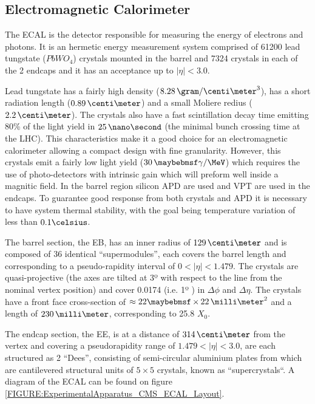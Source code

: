 \subsection{Electromagnetic Calorimeter}
\label{SUBSECTION:ExperimentalApparatus_CMS_ECAL}


The \gls{ECAL} is the detector responsible for measuring the energy of electrons and photons. It is an hermetic energy measurement system comprised of 61200 lead tungstate ($PbWO_4$) crystals mounted in the barrel and 7324 crystals in each of the 2 endcaps and it has an acceptance up to $|\eta|<3.0$.

Lead tungstate has a fairly high density ($8.28\,\gram/\centi\meter^3$), has a short radiation length ($0.89\,\centi\meter$) and a small Moliere redius ($2.2\,\centi\meter$). The crystals also have a fast scintillation decay time emitting 80\% of the light yield in $25\,\nano\second$ (the minimal bunch crossing time at the \gls{LHC}). This characteristics make it a good choice for an electromagnetic calorimeter allowing a compact design with fine granularity. However, this crystals emit a fairly low light yield ($30\,\gamma/\MeV$) which requires the use of photo-detectors with intrinsic gain which will preform well inside a magnitic field. In the barrel region silicon \gls{APD} are used and \gls{VPT} are used in the endcaps. To guarantee good response from both crystals and \gls{APD} it is necessary to have system thermal stability, with the goal being temperature variation of less than $0.1 \celsius$.

The barrel section, the \gls{EB}, has an inner radius of $129\,\centi\meter$ and is composed of 36 identical ``supermodules'', each covers the barrel length and corresponding to a pseudo-rapidity interval of $0<|\eta|<1.479$. The crystals are quasi-projective (the axes are tilted at 3º with respect to the line from the nominal vertex position) and cover 0.0174 (i.e. 1º ) in $\Delta\phi$ and $\Delta\eta$. The crystals have a front face cross-section of $\approx 22 \times 22\,\milli\meter^2$ and a length of $230\,\milli\meter$, corresponding to 25.8 $X_0$.

The endcap section, the \gls{EE}, is at a distance of $314\,\centi\meter$ from the vertex and covering a pseudorapidity range of $1.479<|\eta|<3.0$, are each structured as 2 ``Dees'', consisting of semi-circular aluminium plates from which are cantilevered structural units of $5\times 5$ crystals, known as ``supercrystals``. A diagram of the \gls{ECAL} can be found on figure \ref{FIGURE:ExperimentalApparatus_CMS_ECAL_Layout}.

